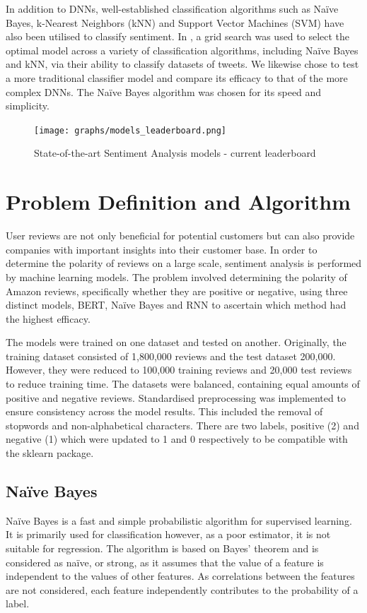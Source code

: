 \documentclass{svproc}
\begin{document}
In addition to DNNs, well-established classification algorithms such as Naïve Bayes, k-Nearest Neighbors (kNN) and Support Vector Machines (SVM) have also been utilised to classify sentiment. In \citep{lochter2016short}, a grid search was used to select the optimal model across a variety of classification algorithms, including Naïve Bayes and kNN, via their ability to classify datasets of tweets. We likewise chose to test a more traditional classifier model and compare its efficacy to that of the more complex DNNs. The Naïve Bayes algorithm was chosen for its speed and simplicity. \begin{figure}
  \centering
    \texttt{[image: graphs/models\_leaderboard.png]}
    \caption{State-of-the-art Sentiment Analysis models - current leaderboard \citep{paperswithcode}}
\end{figure}

\section{Problem Definition and Algorithm}
User reviews are not only beneficial for potential customers but can also provide companies with important insights into their customer base. In order to determine the polarity of reviews on a large scale, sentiment analysis is performed by machine learning models. The problem involved determining the polarity of Amazon reviews, specifically whether they are positive or negative, using three distinct models, BERT, Na\"ive Bayes and RNN to ascertain which method had the highest efficacy.

The models were trained on one dataset and tested on another. Originally, the training dataset consisted of 1,800,000 reviews and the test dataset 200,000. However, they were reduced to 100,000 training reviews and 20,000 test reviews to reduce training time. The datasets were balanced, containing equal amounts of positive and negative reviews. Standardised preprocessing was implemented to ensure consistency across the model results. This included the removal of stopwords and non-alphabetical characters. There are two labels, positive (2) and negative (1) which were updated to 1 and 0 respectively to be compatible with the sklearn package.

\subsection{Na\"ive Bayes}
Na\"ive Bayes is a fast and simple probabilistic algorithm for supervised learning. It is primarily used for classification however, as a poor estimator, it is not suitable for regression. The algorithm is based on Bayes’ theorem and is considered as na\"ive, or strong, as it assumes that the value of a feature is independent to the values of other features. As correlations between the features are not considered, each feature independently contributes to the probability of a label.
\end{document}
